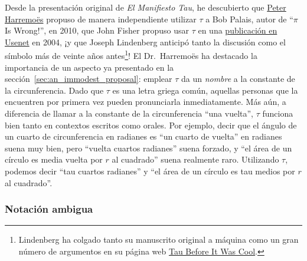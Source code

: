 Desde la presentación original de \emph{El Manifiesto Tau}, he descubierto que \href{http://www.harremoes.dk/Peter/}{Peter Harremo\"{e}s} propuso de manera independiente utilizar $\tau$ a Bob Palais, autor de ``$\pi$ Is Wrong!'', en 2010, que John Fisher propuso usar $\tau$ en una \href{https://groups.google.com/forum/#!msg/sci.math/c-DHmJHSA0A/sLCoOtHB1UAJ}{publicación en Usenet} en 2004, ¡y que Joseph Lindenberg anticipó tanto la discusión como el símbolo más de veinte años antes\footnote{Lindenberg ha colgado tanto su manuscrito original a máquina como un gran número de argumentos en su página web \href{http://sites.google.com/site/taubeforeitwascool/}{Tau Before It Was Cool}.}! El Dr.~Harremo\"{e}s ha destacado la importancia de un aspecto ya presentado en la sección~\ref{sec:an_immodest_proposal}: emplear $\tau$ da un \emph{nombre} a la constante de la circunferencia. Dado que $\tau$ es una letra griega común, aquellas personas que la encuentren por primera vez pueden pronunciarla inmediatamente. Más aún, a diferencia de llamar a la constante de la circunferencia ``una vuelta'',
$\tau$ funciona bien tanto en contextos escritos como orales. Por ejemplo, decir que el ángulo de un cuarto de circunferencia en radianes es ``un cuarto de vuelta'' en radianes suena muy bien, pero ``vuelta cuartos radianes'' suena forzado, y ``el área de un círculo es media vuelta por $r$ al cuadrado'' suena realmente raro. Utilizando $\tau$, podemos decir ``tau cuartos radianes'' y ``el área de un círculo es tau medios por $r$ al cuadrado''.

    \subsubsection{Notación ambigua} %
    \label{sec:ambiguous_notation}

